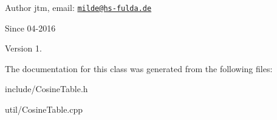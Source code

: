 \begin{DoxyAuthor}{Author}
jtm, email\+:  \href{mailto:milde@hs-fulda.de}{\tt milde@hs-\/fulda.\+de} 
\end{DoxyAuthor}
\begin{DoxySince}{Since}
04-\/2016 
\end{DoxySince}
\begin{DoxyVersion}{Version}
1. 
\end{DoxyVersion}


The documentation for this class was generated from the following files\+:\begin{DoxyCompactItemize}
\item 
include/Cosine\+Table.\+h\item 
util/Cosine\+Table.\+cpp\end{DoxyCompactItemize}
